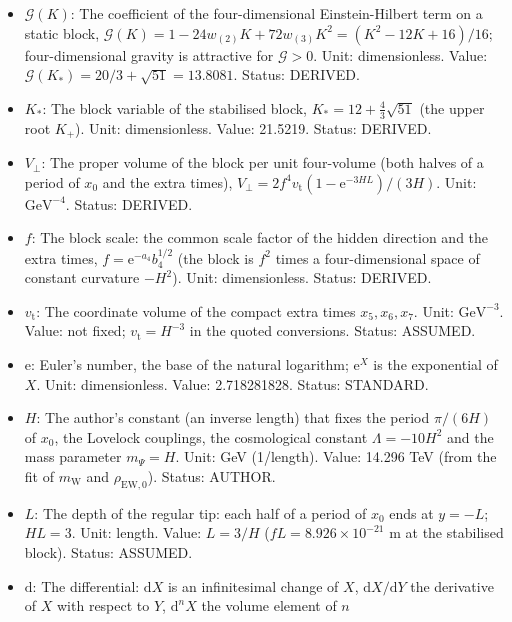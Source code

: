 \documentclass[
  10pt,
]{article}
\begin{document}
\begin{itemize}
  GeV\(^{-2}\). Status: AUTHOR.
\item
  \(\mathcal{G}(K)\): The coefficient of the four-dimensional
  Einstein-Hilbert term on a static block,
  \(\mathcal{G}(K) = 1 - 24w_{(2)}K + 72w_{(3)}K^2 = (K^2 - 12K + 16)/16\);
  four-dimensional gravity is attractive for \(\mathcal{G} > 0\). Unit:
  dimensionless. Value:
  \(\mathcal{G}(K_*) = 20/3 + \sqrt{51} = 13.8081\). Status: DERIVED.
\item
  \(K_*\): The block variable of the stabilised block,
  \(K_* = 12 + \frac43\sqrt{51}\) (the upper root \(K_+\)). Unit:
  dimensionless. Value: 21.5219. Status: DERIVED.
\item
  \(V_\perp\): The proper volume of the block per unit four-volume (both
  halves of a period of \(x_0\) and the extra times),
  \(V_\perp = 2f^4v_{\mathrm{t}}(1 - \mathrm{e}^{-3HL})/(3H)\). Unit:
  \(\mathrm{GeV}^{-4}\). Status: DERIVED.
\item
  \(f\): The block scale: the common scale factor of the hidden
  direction and the extra times, \(f = \mathrm{e}^{-a_4}b_4^{1/2}\) (the
  block is \(f^2\) times a four-dimensional space of constant curvature
  \(-H^2\)). Unit: dimensionless. Status: DERIVED.
\item
  \(v_{\mathrm{t}}\): The coordinate volume of the compact extra times
  \(x_5, x_6, x_7\). Unit: \(\mathrm{GeV}^{-3}\). Value: not fixed;
  \(v_{\mathrm{t}} = H^{-3}\) in the quoted conversions. Status:
  ASSUMED.
\item
  \(\mathrm{e}\): Euler's number, the base of the natural logarithm;
  \(\mathrm{e}^{X}\) is the exponential of \(X\). Unit: dimensionless.
  Value: 2.718281828. Status: STANDARD.
\item
  \(H\): The author's constant (an inverse length) that fixes the period
  \(\pi/(6H)\) of \(x_0\), the Lovelock couplings, the cosmological
  constant \(\Lambda = -10H^2\) and the mass parameter \(m_\Psi = H\).
  Unit: GeV (1/length). Value: 14.296 TeV (from the fit of
  \(m_{\mathrm{W}}\) and \(\rho_{\mathrm{EW},0}\)). Status: AUTHOR.
\item
  \(L\): The depth of the regular tip: each half of a period of \(x_0\)
  ends at \(y = -L\); \(HL = 3\). Unit: length. Value: \(L = 3/H\)
  (\(fL = 8.926\times10^{-21}\) m at the stabilised block). Status:
  ASSUMED.
\item
  \(\mathrm{d}\): The differential: \(\mathrm{d}X\) is an infinitesimal
  change of \(X\), \(\mathrm{d}X/\mathrm{d}Y\) the derivative of \(X\)
  with respect to \(Y\), \(\mathrm{d}^nX\) the volume element of \(n\)

\end{itemize}
\end{document}

